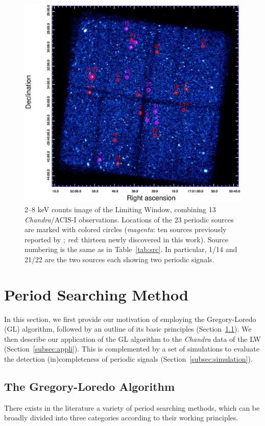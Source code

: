 \documentclass[fleqn,usenatbib]{mnras}
\begin{document}
\begin{figure}
\centering
\includegraphics[scale=0.8]{./figure/LW/ds9.eps}
\caption{2--8 keV counts image of the Limiting Window, combining 13 {\it Chandra}/ACIS-I observations. Locations of the 23 periodic sources are marked with colored circles ({\it magenta}: ten sources previously reported by \citep{2012ApJ...746..165H}; {\it red}: thirteen newly discovered in this work). Source numbering is the same as in Table~\ref{tab:src}. In particular, 1/14 and 21/22 are the two sources each showing two periodic signals.}
\label{fig:FoV}
\end{figure}

\section{Period Searching Method}\label{sec:methods}
In this section, we first provide our motivation of employing the Gregory-Loredo (GL) algorithm, followed by an outline of its basic principles (Section~\ref{subsec:GL}). We then describe our application of the GL algorithm to the {\it Chandra} data of the LW (Section~\ref{subsec:appli}). This is complemented by a set of simulations to evaluate the detection (in)completeness of periodic signals (Section~\ref{subsec:simulation}).  

\subsection{The Gregory-Loredo Algorithm} \label{subsec:GL}
There exists in the literature a variety of period searching methods, which can be broadly divided into three categories according to their working principles. 
\end{document}
